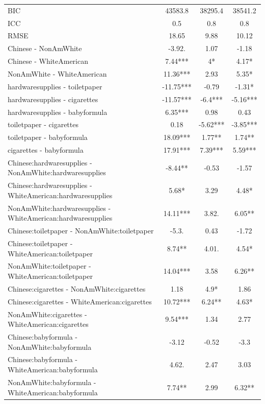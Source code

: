 \documentclass[]{report}
\begin{document}
\begin{longtable}{lccc}
			BIC & \num{43583.8} & \num{38295.4} & \num{38541.2}\\
			ICC & \num{0.5} & \num{0.8} & \num{0.8}\\
			RMSE & \num{18.65} & \num{9.88} & \num{10.12}\\
			\hline
		Chinese - NonAmWhite & -3.92. & 1.07 & -1.18 \\ 
		Chinese - WhiteAmerican & 7.44*** & 4* & 4.17* \\ 
		NonAmWhite - WhiteAmerican & 11.36*** & 2.93 & 5.35* \\ 
		hardwaresupplies - toiletpaper & -11.75*** & -0.79 & -1.31* \\ 
		hardwaresupplies - cigarettes & -11.57*** & -6.4*** & -5.16*** \\ 
		hardwaresupplies - babyformula & 6.35*** & 0.98 & 0.43 \\ 
		toiletpaper - cigarettes & 0.18 & -5.62*** & -3.85*** \\ 
		toiletpaper - babyformula & 18.09*** & 1.77** & 1.74** \\ 
		cigarettes - babyformula & 17.91*** & 7.39*** & 5.59*** \\ 
		Chinese:hardwaresupplies - NonAmWhite:hardwaresupplies & -8.44** & -0.53 & -1.57 \\ 
		Chinese:hardwaresupplies - WhiteAmerican:hardwaresupplies & 5.68* & 3.29 & 4.48* \\ 
		NonAmWhite:hardwaresupplies - WhiteAmerican:hardwaresupplies & 14.11*** & 3.82. & 6.05** \\ 
		Chinese:toiletpaper - NonAmWhite:toiletpaper & -5.3. & 0.43 & -1.72 \\ 
		Chinese:toiletpaper - WhiteAmerican:toiletpaper & 8.74** & 4.01. & 4.54* \\ 
		NonAmWhite:toiletpaper - WhiteAmerican:toiletpaper & 14.04*** & 3.58 & 6.26** \\ 
		Chinese:cigarettes - NonAmWhite:cigarettes & 1.18 & 4.9* & 1.86 \\ 
		Chinese:cigarettes - WhiteAmerican:cigarettes & 10.72*** & 6.24** & 4.63* \\ 
		NonAmWhite:cigarettes - WhiteAmerican:cigarettes & 9.54*** & 1.34 & 2.77 \\ 
		Chinese:babyformula - NonAmWhite:babyformula & -3.12 & -0.52 & -3.3 \\ 
		Chinese:babyformula - WhiteAmerican:babyformula & 4.62. & 2.47 & 3.03 \\ 
		NonAmWhite:babyformula - WhiteAmerican:babyformula & 7.74** & 2.99 & 6.32** \\ 
			\bottomrule
	
	\end{longtable}
	
\end{document}
